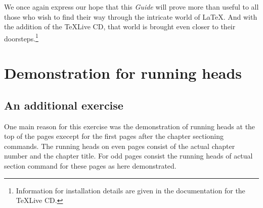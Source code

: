 \documentclass[twoside]{report}
\begin{document}
We once again express our hope that this \textsl{Guide} will prove more than
useful to all those who wish to find their way through the intricate world of
\LaTeX. And with the addition of the \TeX Live CD, that world is brought even
closer to their doorsteps.\footnote{Information for installation details are
given in the documentation for the \TeX Live CD.}

\section[Running heads]{Demonstration for running heads}
\subsection{An additional exercise}
One main reason for this exercise was the demonstration of running heads
at the top of the pages execept for the first pages after the 
chapter sectioning commands. The running heads on even pages consist
of the actual chapter number and the chapter title. For odd pages consist
the running heads of actual section command for these pages as here
demonstrated.
\end{document}
